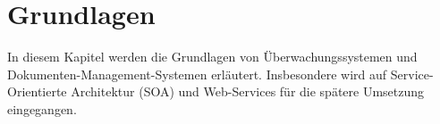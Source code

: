 \section{Grundlagen}
In diesem Kapitel werden die Grundlagen von Überwachungssystemen und Dokumenten-Management-Systemen erläutert.
Insbesondere wird auf Service-Orientierte Architektur (\gls{SOA}) und Web-Services für die spätere Umsetzung eingegangen.














